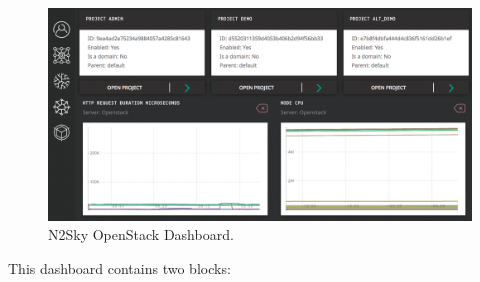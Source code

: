 \begin{figure}[htbp]
\begin{center}
  \includegraphics[width=\linewidth]{components/4/pics/openstack_dashboard.png}
  \caption{N2Sky OpenStack Dashboard.}
  \label{fig:openstack_dashboard}
\end{center}
\end{figure}
 

This dashboard contains two blocks:

